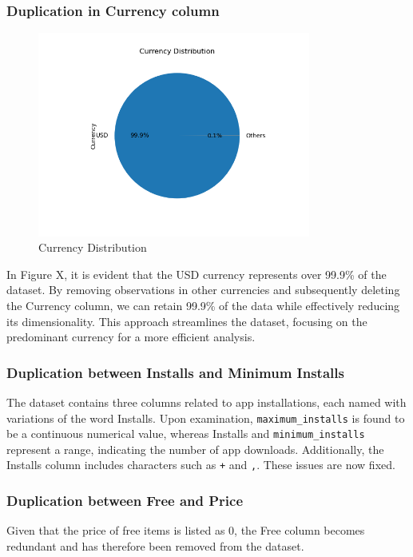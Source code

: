 \subsubsection{Duplication in Currency column}
\begin{figure}[h]
\centering
\includegraphics[width=0.8\textwidth]{docs//assets/currency.png}
\caption{Currency Distribution}
\end{figure}
In Figure X, it is evident that the USD currency represents over 99.9\% of the dataset. By removing observations in other currencies and subsequently deleting the Currency column, we can retain 99.9\% of the data while effectively reducing its dimensionality. This approach streamlines the dataset, focusing on the predominant currency for a more efficient analysis.

\subsubsection{Duplication between Installs and Minimum Installs}
The dataset contains three columns related to app installations, each named with variations of the word Installs. Upon examination, \texttt{maximum\_installs} is found to be a continuous numerical value, whereas Installs and \texttt{minimum\_installs} represent a range, indicating the number of app downloads. Additionally, the Installs column includes characters such as \texttt{+} and \texttt{,}. These issues are now fixed.

\subsubsection{Duplication between Free and Price}
Given that the price of free items is listed as 0, the Free column becomes redundant and has therefore been removed from the dataset.

